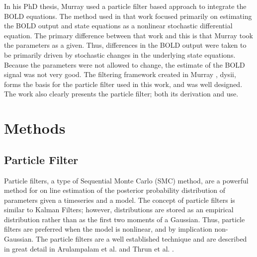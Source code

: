 \documentclass{article}
\begin{document}
In his PhD thesis, Murray \cite{Murray2008} used a particle filter based 
approach to integrate
the \ac{BOLD} equations. The method used in that work focused primarily on estimating
the \ac{BOLD} output and state equations as a nonlinear stochastic differential 
equation. The primary difference between that work and this is that
Murray \cite{Murray2008} took the parameters as a given. Thus, differences in the \ac{BOLD} output
were taken to be primarily driven by stochastic changes in the underlying state
equations. Because the parameters were not allowed to change, the estimate of 
the \ac{BOLD} signal was not very good. The filtering framework created
in Murray \cite{Murray2008}, dysii, forms the basis for the particle 
filter used in this work, 
and was well designed. The work also clearly presents the particle filter;
both its derivation and use. 

\section{Methods}
\label{sec:Methods}
\subsection{Particle Filter}
\label{sec:ParticleFilter}
Particle filters, a type of Sequential Monte Carlo (SMC) method,
are a powerful method for on line estimation of the posterior probability 
distribution of parameters given a timeseries and a model. The concept of 
particle filters is similar to Kalman Filters; however,
distributions are stored as an empirical distribution rather than 
as the first two moments of a Gaussian. Thus, particle filters are 
preferred when the model is nonlinear, and by implication non-Gaussian. 
The particle filters are a well established technique and are 
described in great detail in Arulampalam et al. and Thrun et al. 
\cite{Arulampalam2002a, thrun2008probabilistic}.
\end{document}
